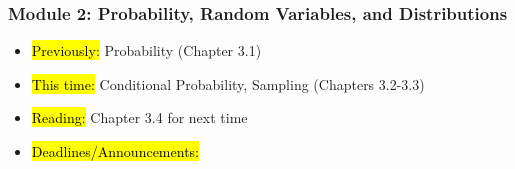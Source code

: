 
\begin{frame}
    \frametitle{Module 2: Probability, Random Variables, and Distributions}
    \begin{itemize}
        \item \hl{Previously: } Probability (Chapter 3.1)
        \item \hl{This time: } Conditional Probability, Sampling (Chapters 3.2-3.3)
        \item \hl{Reading: } Chapter 3.4 for next time
        \item \hl{Deadlines/Announcements: } 
    \end{itemize}
    
\end{frame}
    